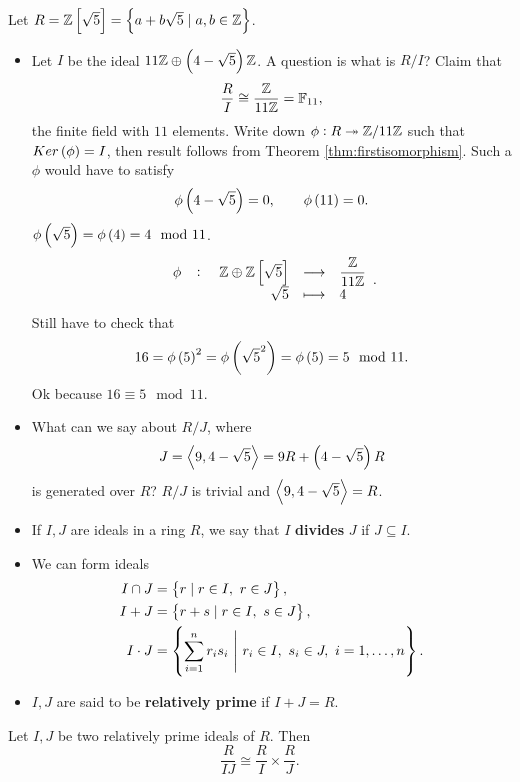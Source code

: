 \pagebreak

\begin{example*}
Let $ R = \Z\sbr{\sqrt{5}} = \cbr{a + b\sqrt{5} \mid a, b \in \Z} $.
\begin{itemize}
\item Let $ I $ be the ideal $ 11\Z \oplus \br{4 - \sqrt{5}}\Z $. A question is what is $ R / I $? Claim that
$$ \dfrac{R}{I} \cong \dfrac{\mathbb{Z}}{11\mathbb{Z}} = \mathbb{F}_{11}, $$
the finite field with $ 11 $ elements. Write down $ \phi : R \twoheadrightarrow \mathbb{Z} / 11\mathbb{Z} $ such that $ Ker\br{\phi} = I $, then result follows from Theorem \ref{thm:firstisomorphism}. Such a $ \phi $ would have to satisfy
$$ \phi\br{4 - \sqrt{5}} = 0, \qquad \phi\br{11} = 0. $$
$ \phi\br{\sqrt{5}} = \phi\br{4} = 4 \mod 11 $.
$$ \function[\phi]{\Z \oplus \Z\sbr{\sqrt{5}}}{\dfrac{\Z}{11\Z}}{\sqrt{5}}{4}. $$
Still have to check that
$$ 16 = \phi\br{5}^2 = \phi\br{\sqrt{5}^2} = \phi\br{5} = 5 \mod 11. $$
Ok because $ 16 \equiv 5 \mod 11 $.
\item What can we say about $ R / J $, where
$$ J = \abr{9, 4 - \sqrt{5}} = 9R + \br{4 - \sqrt{5}}R $$
is generated over $ R $? $ R / J $ is trivial and $ \left\langle 9, 4 - \sqrt{5} \right\rangle = R $.
\end{itemize}
\end{example*}

\begin{definition}
\hfill
\begin{itemize}
\item If $ I, J $ are ideals in a ring $ R $, we say that $ I $ \textbf{divides} $ J $ if $ J \subseteq I $.
\item We can form ideals
\begin{align*}
I \cap J & = \cbr{r \mid r \in I, \ r \in J}, \\
I + J & = \cbr{r + s \mid r \in I, \ s \in J}, \\
I \cdot J & = \cbr{\sum_{i = 1}^n r_is_i \ \Bigg| \ r_i \in I, \ s_i \in J, \ i = 1, \dots, n}.
\end{align*}
\item $ I, J $ are said to be \textbf{relatively prime} if $ I + J = R $.
\end{itemize}
\end{definition}

\begin{theorem}
\label{thm:chineseremainder}
Let $ I, J $ be two relatively prime ideals of $ R $. Then
$$ \dfrac{R}{IJ} \cong \dfrac{R}{I} \times \dfrac{R}{J}. $$
\end{theorem}

